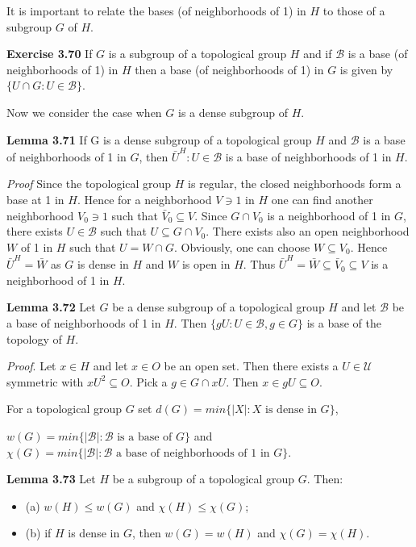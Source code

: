 \documentclass[12pt]{article}
\begin{document}
    It is important to relate the bases (of neighborhoods of 1) in $H$ to those of a subgroup $G$ of $H$.

\textbf{Exercise 3.70} If $G$ is a subgroup of a topological group $H$ and if $\mathcal{B}$ is a base (of neighborhoods of 1) in $H$ then
a base (of neighborhoods of 1) in $G$ is given by $\{U \cap G : U \in \mathcal{B}\}$.


    Now we consider the case when $G$ is a dense subgroup of $H$.


\textbf{Lemma 3.71} If G is a dense subgroup of a topological group $H$ and $\mathcal{B}$ is a base of neighborhoods of 1 in $G$,
then ${\bar{U}^H: U \in \mathcal{B}}$ is a base of neighborhoods of 1 in $H$.


\emph{Proof} Since the topological group $H$ is regular, the closed neighborhoods form a base at 1 in $H$. Hence for
a neighborhood $V \ni 1$ in $H$ one can find another neighborhood $V_0 \ni 1$ such that $\bar{V}_0 \subseteq V$. Since $G \cap V_0$ is a
neighborhood of 1 in $G$, there exists $U \in \mathcal{B}$ such that $U \subseteq G \cap V_0$. There exists also an open neighborhood $W$
of 1 in $H$ such that $U = W \cap G$. Obviously, one can choose $W \subseteq V_0$. Hence $\bar{U}^H = \bar{W}$ as $G$ is dense in $H$ and
$W$ is open in $H$. Thus $\bar{U}^H = \bar{W} \subseteq \bar{V}_0 \subseteq V$ is a neighborhood of 1 in $H$.


\textbf{Lemma 3.72} Let $G$ be a dense subgroup of a topological group $H$ and let $\mathcal{B}$ be a base of neighborhoods of 1 in
$H$. Then $\{gU : U \in \mathcal{B}, g \in G\}$ is a base of the topology of $H$.


\emph{Proof}. Let $x \in H$ and let $x \in O$ be an open set. Then there exists a $U \in \mathcal{U}$ symmetric with $xU^2 \subseteq O$. Pick a
$g \in G \cap xU$. Then $x \in gU \subseteq O$.


    For a topological group $G$ set $d(G) = min\{|X| : X \text{ is dense in } G\}$,


        $w(G) = min\{|\mathcal{B}| : \mathcal{B} \text{ is a base of } G\}$ and $\chi(G) = min\{|\mathcal{B}| : \mathcal{B} \text{ a base of neighborhoods of 1 in } G\}$.


\textbf{Lemma 3.73} Let $H$ be a subgroup of a topological group $G$. Then:
    \begin{itemize}

        \item (a) $w(H) \leq w(G)$ and $\chi(H) \leq \chi(G)$;
        
        \item (b) if $H$ is dense in $G$, then $w(G) = w(H)$ and $\chi(G) = \chi(H)$.

    \end{itemize}
\end{document}
